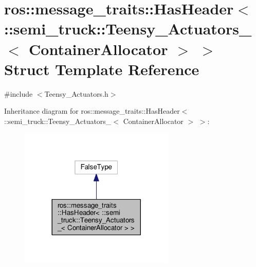 \hypertarget{structros_1_1message__traits_1_1_has_header_3_01_1_1semi__truck_1_1_teensy___actuators___3_01_container_allocator_01_4_01_4}{}\section{ros\+:\+:message\+\_\+traits\+:\+:Has\+Header$<$ \+:\+:semi\+\_\+truck\+:\+:Teensy\+\_\+\+Actuators\+\_\+$<$ Container\+Allocator $>$ $>$ Struct Template Reference}
\label{structros_1_1message__traits_1_1_has_header_3_01_1_1semi__truck_1_1_teensy___actuators___3_01_container_allocator_01_4_01_4}


{\ttfamily \#include $<$Teensy\+\_\+\+Actuators.\+h$>$}



Inheritance diagram for ros\+:\+:message\+\_\+traits\+:\+:Has\+Header$<$ \+:\+:semi\+\_\+truck\+:\+:Teensy\+\_\+\+Actuators\+\_\+$<$ Container\+Allocator $>$ $>$\+:\nopagebreak
\begin{figure}[H]
\begin{center}
\leavevmode
\includegraphics[width=209pt]{structros_1_1message__traits_1_1_has_header_3_01_1_1semi__truck_1_1_teensy___actuators___3_01_co18eb1472522127f29dda17275cdd5b27}
\end{center}
\end{figure}


